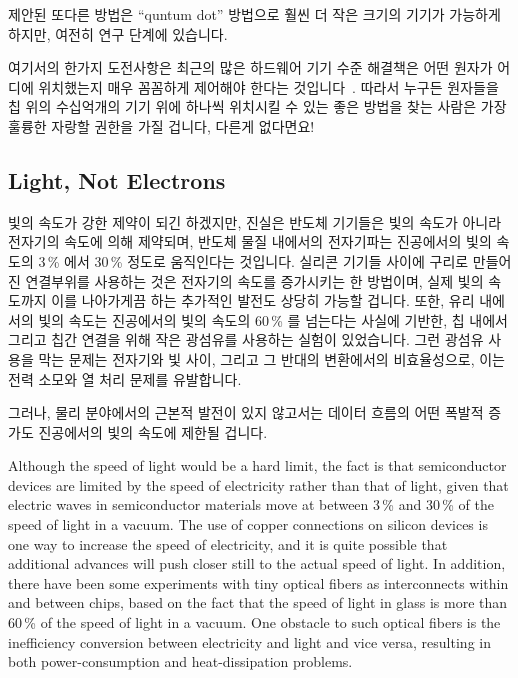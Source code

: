 \fi

제안된 또다른 방법은 ``quntum dot'' 방법으로 훨씬 더 작은 크기의 기기가
가능하게 하지만, 여전히 연구 단계에 있습니다.

여기서의 한가지 도전사항은 최근의 많은 하드웨어 기기 수준 해결책은 어떤 원자가
어디에 위치했는지 매우 꼼꼼하게 제어해야 한다는
것입니다~\cite{MichaelJKelly2017DeviceLevel}.
따라서 누구든 원자들을 칩 위의 수십억개의 기기 위에 하나씩 위치시킬 수 있는
좋은 방법을 찾는 사람은 가장 훌륭한 자랑할 권한을 가질 겁니다, 다른게 없다면요!

\iffalse

Another proposed workaround is the ``quantum dot'' approach that
allows much smaller device sizes, but which is still in the research
stage.

One challenge is that many recent hardware-device-level breakthroughs
require very tight control of which atoms are placed
where~\cite{MichaelJKelly2017DeviceLevel}.
It therefore seems likely that whoever finds a good way to hand-place
atoms on each of the billions of devices on a chip will have most
excellent bragging rights, if nothing else!

\fi

\subsection{Light, Not Electrons}
\label{sec:cpu:Light, Not Electrons}

빛의 속도가 강한 제약이 되긴 하겠지만, 진실은 반도체 기기들은 빛의 속도가
아니라 전자기의 속도에 의해 제약되며, 반도체 물질 내에서의 전자기파는
진공에서의 빛의 속도의 3\,\% 에서 30\,\% 정도로 움직인다는 것입니다.
실리콘 기기들 사이에 구리로 만들어진 연결부위를 사용하는 것은 전자기의 속도를
증가시키는 한 방법이며, 실제 빛의 속도까지 이를 나아가게끔 하는 추가적인 발전도
상당히 가능할 겁니다.
또한, 유리 내에서의 빛의 속도는 진공에서의 빛의 속도의 60\,\% 를 넘는다는
사실에 기반한, 칩 내에서 그리고 칩간 연결을 위해 작은 광섬유를 사용하는 실험이
있었습니다.
그런 광섬유 사용을 막는 문제는 전자기와 빛 사이, 그리고 그 반대의 변환에서의
비효율성으로, 이는 전력 소모와 열 처리 문제를 유발합니다.

그러나, 물리 분야에서의 근본적 발전이 있지 않고서는 데이터 흐름의 어떤 폭발적
증가도 진공에서의 빛의 속도에 제한될 겁니다.

\iffalse

Although the speed of light would be a hard limit, the fact is that
semiconductor devices are limited by the speed of electricity rather
than that of light, given that electric waves in semiconductor materials
move at between 3\,\% and 30\,\% of the speed of light in a vacuum.
The use of copper connections on silicon devices is one way to increase
the speed of electricity, and it is quite possible that additional
advances will push closer still to the actual speed of light.
In addition, there have been some experiments with tiny optical fibers
as interconnects within and between chips, based on the fact that
the speed of light in glass is more than 60\,\% of the speed of light
in a vacuum.
One obstacle to such optical fibers is the inefficiency conversion
between electricity and light and vice versa, resulting in both
power-consumption and heat-dissipation problems.

